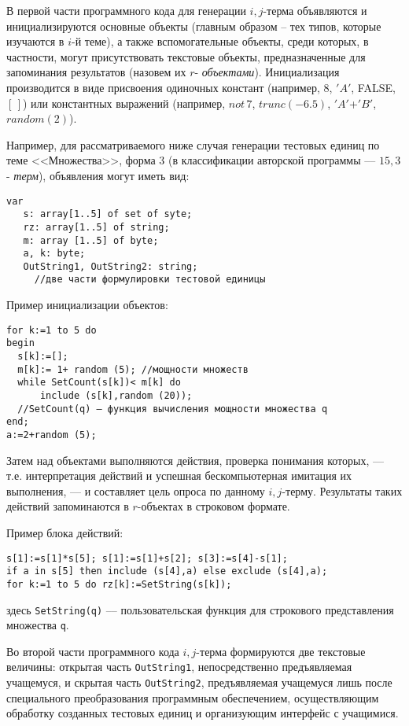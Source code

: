 В первой части программного кода для генерации $i,j$-терма объявляются и инициализируются основные объекты (главным образом -- тех типов, которые изучаются в $i$-й теме), а также вспомогательные объекты, среди которых, в частности, могут присутствовать текстовые объекты, предназначенные для запоминания результатов (назовем их $r$-\textit{ объектами}). Инициализация производится в виде присвоения одиночных констант (например, $8$, $'A'$, FALSE, $[\,]$) или константных выражений (например, $not\, 7$, $trunc (-6.5)$, $'A'$+$'B'$, $random(2)$).
\par\smallskip
Например, для рассматриваемого ниже случая генерации тестовых единиц по теме <<Множества>>, форма $3$ (в классификации авторской программы --– $15,3$-\textit{ терм}), объявления могут иметь вид:
\par\smallskip
\begin{verbatim}
var
   s: array[1..5] of set of syte;
   rz: array[1..5] of string;
   m: array [1..5] of byte;
   a, k: byte;
   OutString1, OutString2: string;
	 //две части формулировки тестовой единицы
\end{verbatim}

Пример инициализации объектов:
\par\smallskip
\begin{verbatim}
for k:=1 to 5 do
begin
  s[k]:=[];
  m[k]:= 1+ random (5); //мощности множеств
  while SetCount(s[k])< m[k] do
	  include (s[k],random (20));
  //SetCount(q) – функция вычисления мощности множества q
end;
a:=2+random (5);
\end{verbatim}
\par\smallskip
Затем над объектами выполняются действия, проверка понимания которых, --- т.е. интерпретация действий и успешная бескомпьютерная имитация их выполнения, --- и составляет цель опроса по данному $i,j$-терму. Результаты таких действий запоминаются в $r$-объектах в строковом формате.

Пример блока действий:
\par\smallskip
\begin{verbatim}
s[1]:=s[1]*s[5]; s[1]:=s[1]+s[2]; s[3]:=s[4]-s[1];
if a in s[5] then include (s[4],a) else exclude (s[4],a);
for k:=1 to 5 do rz[k]:=SetString(s[k]);
\end{verbatim}
здесь \verb'SetString(q)' --– пользовательская функция для строкового представления множества \verb'q'.
\par\smallskip
Во второй части программного кода $i,j$-терма формируются две текстовые величины: открытая часть \verb'OutString1', непосредственно предъявляемая учащемуся, и скрытая часть \verb'OutString2', предъявляемая учащемуся лишь после специального преобразования программным обеспечением, осуществляющим обработку созданных тестовых единиц и организующим интерфейс с учащимися.

